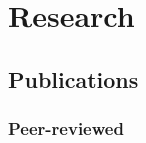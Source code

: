 \documentclass[10pt,letterpaper]{article}
\renewenvironment{itemize}{
  \begin{list}{}{
    \setlength{\leftmargin}{1.5em}
    \setlength{\itemsep}{0.25em}
    \setlength{\parskip}{0pt}
    \setlength{\parsep}{0.25em}
  }
}{
  \end{list}
}
\begin{document}
%
%
%
%
%
%

\section*{Research}

\subsection*{Publications}

\subsubsection*{Peer-reviewed}
\end{document}
